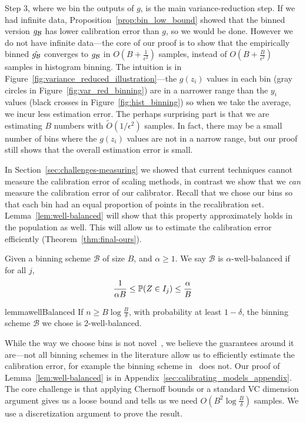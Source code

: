 Step 3, where we bin the outputs of $g$, is the main variance-reduction step. If we had infinite data, Proposition~\ref{prop:bin_low_bound} showed that the binned version $g_{\mathcal{B}{}}$ has lower calibration error than $g$, so we would be done. However we do not have infinite data---the core of our proof is to show that the empirically binned $\hat{g_{\mathcal{B}{}}}$ converges to $g_{\mathcal{B}{}}$ in $O(B + \frac{1}{\epsilon^2})$ samples, instead of $O(B + \frac{B}{\epsilon^2})$ samples in histogram binning. The intuition is in Figure~\ref{fig:variance_reduced_illustration}---the $g(z_i)$ values in each bin (gray circles in Figure~\ref{fig:var_red_binning}) are in a narrower range than the $y_i$ values (black crosses in Figure~\ref{fig:hist_binning}) so when we take the average, we incur less estimation error. The perhaps surprising part is that we are estimating $B$ numbers with $\widetilde{O}(1/\epsilon^2)$ samples. In fact, there may be a small number of bins where the $g(z_i)$ values are not in a narrow range, but our proof still shows that the overall estimation error is small.

In Section~\ref{sec:challenges-measuring} we showed that current techniques cannot measure the calibration error of scaling methods, in contrast we show that we \emph{can} measure the calibration error of our calibrator. Recall that we chose our bins so that each bin had an equal proportion of points in the recalibration set. Lemma~\ref{lem:well-balanced} will show that this property approximately holds in the population as well. This will allow us to estimate the calibration error efficiently (Theorem~\ref{thm:final-ours}).

\begin{definition}
Given a binning scheme $\mathcal{B}$ of size $B$, and $\alpha \geq 1$. We say $\mathcal{B}$ is $\alpha$-well-balanced if for all $j$,
  \[ \frac{1}{\alpha B} \leq \mathbb{P}(Z \in I_j) \leq \frac{\alpha}{B}\]
\end{definition}

\begin{restatable}{lemma}{wellBalanced}
\label{lem:well-balanced}
If $n \geq B\log{\frac{B}{\delta}}$, with probability at least $1 - \delta$, the binning scheme $\mathcal{B}$ we chose is 2-well-balanced.
\end{restatable}

While the way we choose bins is not novel~\cite{zadrozny2001calibrated}, we believe the guarantees around it are---not all binning schemes in the literature allow us to efficiently estimate the calibration error, for example the binning scheme in~\cite{guo2017calibration} does not. Our proof of Lemma~\ref{lem:well-balanced} is in Appendix~\ref{sec:calibrating_models_appendix}. The core challenge is that applying Chernoff bounds or a standard VC dimension argument gives us a loose bound and tells us we need $O(B^2\log{\frac{B}{\delta}})$ samples. We use a discretization argument to prove the result.

